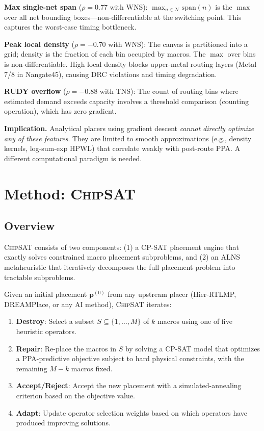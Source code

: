 \documentclass[sigconf,anonymous,review,9pt]{acmart}
\begin{document}
\textbf{Max single-net span} ($\rho = 0.77$ with WNS): $\max_{n \in \mathcal{N}} \text{span}(n)$ is the $\max$ over all net bounding boxes---non-differentiable at the switching point. This captures the worst-case timing bottleneck.

\textbf{Peak local density} ($\rho = -0.70$ with WNS): The canvas is partitioned into a grid; density is the fraction of each bin occupied by macros. The $\max$ over bins is non-differentiable. High local density blocks upper-metal routing layers (Metal 7/8 in Nangate45), causing DRC violations and timing degradation.

\textbf{RUDY overflow} ($\rho = -0.88$ with TNS): The count of routing bins where estimated demand exceeds capacity involves a threshold comparison (counting operation), which has zero gradient.

\textbf{Implication.} Analytical placers using gradient descent \emph{cannot directly optimize any of these features}. They are limited to smooth approximations (e.g., density kernels, log-sum-exp HPWL) that correlate weakly with post-route PPA. A different computational paradigm is needed.


\section{Method: \textsc{ChipSAT}}
\label{sec:method}

\subsection{Overview}

\textsc{ChipSAT} consists of two components: (1) a CP-SAT placement engine that exactly solves constrained macro placement subproblems, and (2) an ALNS metaheuristic that iteratively decomposes the full placement problem into tractable subproblems.

Given an initial placement $\mathbf{p}^{(0)}$ from any upstream placer (Hier-RTLMP, DREAMPlace, or any AI method), \textsc{ChipSAT} iterates:
\begin{enumerate}
    \item \textbf{Destroy}: Select a subset $S \subseteq \{1, \ldots, M\}$ of $k$ macros using one of five heuristic operators.
    \item \textbf{Repair}: Re-place the macros in $S$ by solving a CP-SAT model that optimizes a PPA-predictive objective subject to hard physical constraints, with the remaining $M - k$ macros fixed.
    \item \textbf{Accept/Reject}: Accept the new placement with a simulated-annealing criterion based on the objective value.
    \item \textbf{Adapt}: Update operator selection weights based on which operators have produced improving solutions.
\end{enumerate}
\end{document}
